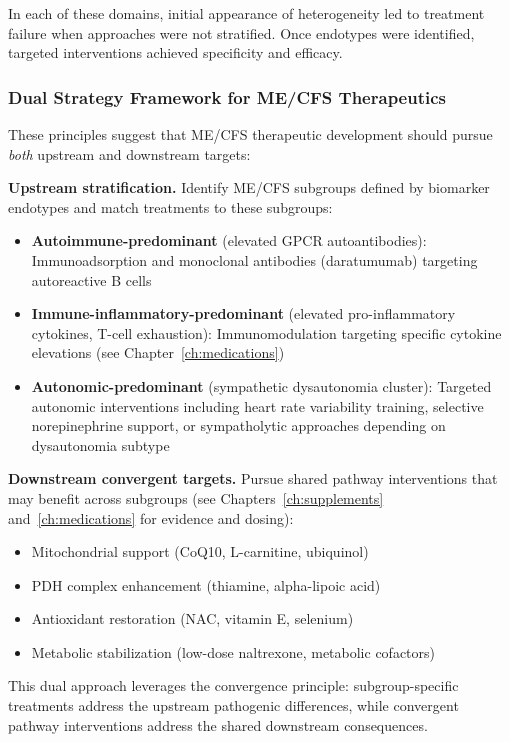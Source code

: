 In each of these domains, initial appearance of heterogeneity led to treatment failure when approaches were not stratified. Once endotypes were identified, targeted interventions achieved specificity and efficacy.

\subsubsection*{Dual Strategy Framework for ME/CFS Therapeutics}

These principles suggest that ME/CFS therapeutic development should pursue \textit{both} upstream and downstream targets:

\textbf{Upstream stratification.} Identify ME/CFS subgroups defined by biomarker endotypes and match treatments to these subgroups:
\begin{itemize}
    \item \textbf{Autoimmune-predominant} (elevated GPCR autoantibodies): Immunoadsorption and monoclonal antibodies (daratumumab) targeting autoreactive B cells~\cite{Fluge2025daratumumab, Stein2024immunoadsorption}
    \item \textbf{Immune-inflammatory-predominant} (elevated pro-inflammatory cytokines, T-cell exhaustion): Immunomodulation targeting specific cytokine elevations (see Chapter~\ref{ch:medications})
    \item \textbf{Autonomic-predominant} (sympathetic dysautonomia cluster): Targeted autonomic interventions including heart rate variability training, selective norepinephrine support, or sympatholytic approaches depending on dysautonomia subtype~\cite{Slomko2020autonomic}
\end{itemize}

\textbf{Downstream convergent targets.} Pursue shared pathway interventions that may benefit across subgroups (see Chapters~\ref{ch:supplements} and~\ref{ch:medications} for evidence and dosing):
\begin{itemize}
    \item Mitochondrial support (CoQ10, L-carnitine, ubiquinol)
    \item PDH complex enhancement (thiamine, alpha-lipoic acid)
    \item Antioxidant restoration (NAC, vitamin E, selenium)
    \item Metabolic stabilization (low-dose naltrexone, metabolic cofactors)
\end{itemize}

This dual approach leverages the convergence principle: subgroup-specific treatments address the upstream pathogenic differences, while convergent pathway interventions address the shared downstream consequences.

